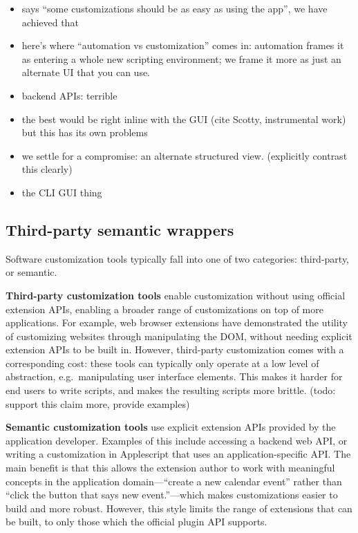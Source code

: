 \documentclass[sigplan,10pt,anonymous,review]{acmart}
\providecommand{\tightlist}{%
  \setlength{\itemsep}{0pt}\setlength{\parskip}{0pt}}
\begin{document}
\begin{itemize}
\tightlist
\item
  \citep{maclean1990} says ``some customizations should be as easy as
  using the app'', we have achieved that
\item
  here's where ``automation vs customization'' comes in: automation
  frames it as entering a whole new scripting environment; we frame it
  more as just an alternate UI that you can use.
\item
  backend APIs: terrible
\item
  the best would be right inline with the GUI (cite Scotty, instrumental
  work) but this has its own problems
\item
  we settle for a compromise: an alternate structured view. (explicitly
  contrast this clearly)
\item
  the CLI GUI thing
\end{itemize}

\hypertarget{third-party-semantic-wrappers}{%
\subsection{Third-party semantic
wrappers}\label{third-party-semantic-wrappers}}

Software customization tools typically fall into one of two categories:
third-party, or semantic.

\textbf{Third-party customization tools} enable customization without
using official extension APIs, enabling a broader range of
customizations on top of more applications. For example, web browser
extensions have demonstrated the utility of customizing websites through
manipulating the DOM, without needing explicit extension APIs to be
built in. However, third-party customization comes with a corresponding
cost: these tools can typically only operate at a low level of
abstraction, e.g.~manipulating user interface elements. This makes it
harder for end users to write scripts, and makes the resulting scripts
more brittle. (todo: support this claim more, provide examples)

\textbf{Semantic customization tools} use explicit extension APIs
provided by the application developer. Examples of this include
accessing a backend web API, or writing a customization in Applescript
that uses an application-specific API. The main benefit is that this
allows the extension author to work with meaningful concepts in the
application domain---``create a new calendar event'' rather than ``click
the button that says new event.''---which makes customizations easier to
build and more robust. However, this style limits the range of
extensions that can be built, to only those which the official plugin
API supports.
\end{document}

